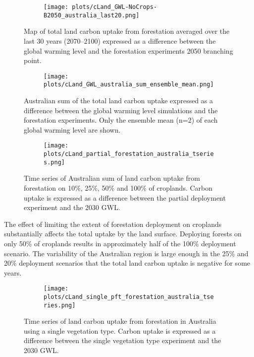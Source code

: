 \documentclass[]{article}
\begin{document}
\begin{figure}[H]
    \centering
    \begin{subfigure}[b]{\linewidth}
        \texttt{[image: plots/cLand\_GWL-NoCrops-B2050\_australia\_last20.png]}
    \end{subfigure}
    \caption{Map of total land carbon uptake from forestation averaged over the last 30 years (2070--2100) expressed as a difference between the global warming level and the forestation experiments 2050 branching point.}
    \label{fig:aus_map_cLand}
\end{figure}

\begin{figure}[H]
    \centering
    \begin{subfigure}[b]{\linewidth}
        \texttt{[image: plots/cLand\_GWL\_australia\_sum\_ensemble\_mean.png]}
    \end{subfigure}
    \caption{Australian sum of the total land carbon uptake expressed as a difference between the global warming level simulations and the forestation experiments. Only the ensemble mean (n=2) of each global warming level are shown.}
    \label{fig:australia_cLand}
\end{figure}

\begin{figure}[H]
    \centering
    \begin{subfigure}[b]{\linewidth}
        \texttt{[image: plots/cLand\_partial\_forestation\_australia\_tseries.png]}
    \end{subfigure}
    \caption{Time series of Australian sum of land carbon uptake from forestation on 10\%, 25\%, 50\% and 100\% of croplands. Carbon uptake is expressed as a difference between the partial deployment experiment and the 2030 GWL.}
    \label{fig:australia_cLand_tseries}
\end{figure}

The effect of limiting the extent of forestation deployment on croplands substantially affects the total uptake by the land surface.
Deploying forests on only 50\% of croplands results in approximately half of the 100\% deployment scenario.
The variability of the Australian region is large enough in the 25\% and 20\% deployment scenarios that the total land carbon uptake is negative for some years.

\begin{figure}[H]
    \centering
    \begin{subfigure}[b]{\linewidth}
        \texttt{[image: plots/cLand\_single\_pft\_forestation\_australia\_tseries.png]}
    \end{subfigure}
    \caption{Time series of land carbon uptake from forestation in Australia using a single vegetation type. Carbon uptake is expressed as a difference between the single vegetation type experiment and the 2030 GWL.}
    \label{fig:australia_cLand_tseries_veg_type}
\end{figure}
\end{document}
